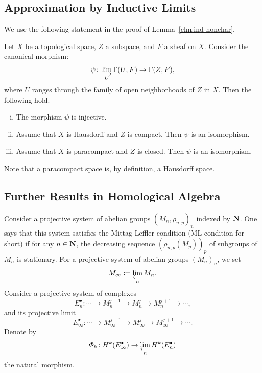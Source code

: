 \subsection{Approximation by Inductive Limits}

We use the following statement in the proof of Lemma~\ref{clm:ind-nonchar}.

\begin{Proposition+}[{\cite[Proposition 2.5.1]{KS90}}]\label{prop:ks2.5.1}
  Let \(X\) be a topological space, 
  \(Z\) a subspace, and \(F\) a sheaf on \(X\). 
  Consider the canonical morphism:
  \[
    \psi\colon \indlim[U]\Gamma(U;F)
    \to 
    \Gamma(Z;F),
  \]
  where \(U\) ranges through the family of 
  open neighborhoods of \(Z\) in \(X\). 
  Then the following hold.
  \begin{enumerate}[(i)]
    \item The morphism \(\psi\) is injective. 
    \item Assume that \(X\) is Hausdorff and \(Z\) is compact. 
    Then \(\psi\) is an isomorphism.
    \item Assume that \(X\) is paracompact and \(Z\) is closed. 
    Then \(\psi\) is an isomorphism.
  \end{enumerate}
\end{Proposition+}

Note that a paracompact space 
is, by definition, a Hausdorff space. 

\subsection{Further Results in Homological Algebra}\label{ssec:ML}

Consider a projective system of abelian groups \(
  \left(M_n,\rho_{n,p}\right)_n
\) indexed by \(\nn\). 
One says that this system satisfies 
the Mittag-Leffler condition (ML condition for short) 
if for any \(n\in\nn\), the decreasing sequence \(
  (\rho_{n,p}(M_p))_p
\) of subgroups of \(M_n\) is stationary.
For a projective system of abelian groups \((M_{n})_n\), 
we set \[
  M_{\infty}\coloneqq \prolim[n]M_n.
\]
Consider a projective system of complexes
\begin{equation}
  E_n^{\bullet}\colon 
  \cdots\to M_{n}^{j-1}\to M_{n}^{j}\to M_{n}^{j+1}\to\cdots,
\end{equation}
and its projective limit
\begin{equation}
  E_{\infty}^{\bullet}\colon 
  \cdots
  \to M_{\infty}^{j-1}
  \to M_{\infty}^{j}
  \to M_{\infty}^{j+1}
  \to\cdots.
\end{equation}
Denote by 
\begin{equation}
  \varPhi_{k}\colon H^{k}(E_{\infty}^{\bullet})\to \prolim[n]H^{k}(E_{n}^{\bullet})
\end{equation}
the natural morphism.

